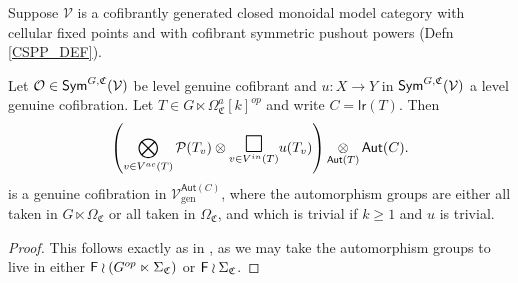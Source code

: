 \documentclass[a4paper,10pt
,draft
]{article}%
\renewcommand{\1}{\eta}%
\newcommand{\OC}{\Omega_{\mathfrak C}}
\begin{document}
\begin{lemma} %
      \label{EXMAINLEM LEM}
      Suppose $\mathcal{V}$ is a cofibrantly generated closed monoidal model category
      with cellular fixed points and
      with cofibrant symmetric pushout powers (Defn \ref{CSPP_DEF}).
      
      Let $\mathcal{O} \in \mathsf{Sym}^{G,\mathfrak C}(\mathcal{V})$
      be level genuine cofibrant
      and  
      $u: X \to Y$ in $\mathsf{Sym}^{G, \mathfrak C}(\mathcal V)$ a level genuine cofibration. 
      Let $T \in G \ltimes \Omega_{\mathfrak C}^a[k]^{op}$ and write $C = \mathsf{lr}(T)$.
      Then
      \begin{equation}\label{EXMAINLEM EQ}
            \left(
                  \bigotimes\limits_{v \in V^{ac}(T)}\P(T_v) \otimes
                  \underset{v \in V^{in}(T)}
                  {\mathlarger{\mathlarger{\mathlarger{\square}}}}
                  u(T_v)
            \right) 
            \mathop{\otimes}\limits_{\mathsf{Aut}(T)} \mathsf{Aut}(C).
      \end{equation}
      is a genuine cofibration in 
      $\mathcal{V}^{\mathsf{Aut}(C)}_{\text{gen}}$,
      where the automorphism groups are either all taken in $G \ltimes \OC$ or all taken in $\Omega_{\mathfrak C}$,
      and which is trivial if $k \geq 1$ and $u$ is trivial.	
\end{lemma}
\begin{proof}
      This follows exactly as in \cite{BP_geo}, as we may take the automorphism groups to live in either
      $\mathsf{F} \wr (G^{op} \ltimes \Sigma_{\mathfrak C})$ or $\mathsf{F} \wr \Sigma_{\mathfrak C}$.
\end{proof}





\end{document}

